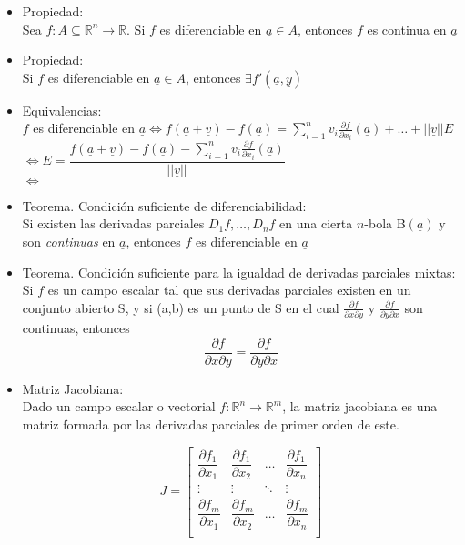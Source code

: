 \documentclass[a4paper, 12pt]{article}
\begin{document}
\begin{itemize}
\item Propiedad: \\
Sea $f:A\subseteq \mathbb{R}^n \to \mathbb{R}$. Si $f$ es diferenciable en $\underline{a} \in A$, entonces $f$ es continua en $\underline{a}$
\item Propiedad: \\
Si $f$ es diferenciable en $\underline{a} \in A$, entonces $\exists f'(\underline{a},\underline{y})$

\item Equivalencias: \\
$f$ es diferenciable en $\displaystyle \underline{a} \Longleftrightarrow f(\underline{a}+\underline{v})-f(\underline{a})=\sum_{i=1}^n v_i \frac{\partial f}{\partial x_i}(\underline{a}) + \dots +||\underline{v}||E$ \\
$\Longleftrightarrow E = \dfrac{f(\underline{a} + \underline{v})-f(\underline{a})-\displaystyle \sum_{i=1}^n v_i \frac{\partial f}{\partial x_i}(\underline{a})}{||\underline{v}||}$ \\
$\Longleftrightarrow$

\item Teorema. Condición suficiente de diferenciabilidad: \\
Si existen las derivadas parciales $D_1f, \dots, D_nf$ en una cierta $n$-bola B$(\underline{a})$ y son \emph{continuas} en $\underline{a}$, entonces $f$ es diferenciable en $\underline{a}$

\item Teorema. Condición suficiente para la igualdad de derivadas parciales mixtas: \\
Si $f$ es un campo escalar tal que sus derivadas parciales existen en un conjunto abierto S, y si (a,b) es un punto de S en el cual $\frac{\partial f}{\partial x \partial y}$ y $\frac{\partial f}{\partial y \partial x}$ son continuas, entonces $$\displaystyle \frac{\partial f}{\partial x \partial y} = \frac{\partial f}{\partial y \partial x}$$

\item Matriz Jacobiana: \\
Dado un campo escalar o vectorial $f:\mathbb{R}^n \to \mathbb{R}^m$, la matriz jacobiana es una matriz formada por las derivadas parciales de primer orden de este.

\[J= \left[ \begin{array}{cccc}
\dfrac{\partial f_1}{\partial x_1} & \dfrac{\partial f_1}{\partial x_2} & \dots & \dfrac{\partial f_1}{\partial x_n} \\
\vdots & \vdots  & \ddots & \vdots \\
\dfrac{\partial f_m}{\partial x_1} & \dfrac{\partial f_m}{\partial x_2} & \dots & \dfrac{\partial f_m}{\partial x_n} \\ \end{array} \right]\] 


\end{itemize}
\end{document}
